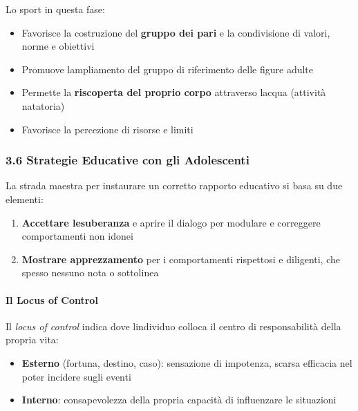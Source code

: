 \documentclass[a4paper,11pt]{article}
\providecommand{\tightlist}{%
  \setlength{\itemsep}{0pt}\setlength{\parskip}{0pt}}
\begin{document}
Lo sport in questa fase:

\begin{itemize}
      \tightlist
      \item
            Favorisce la costruzione del \textbf{gruppo dei pari} e la
            condivisione di valori, norme e obiettivi
      \item
            Promuove l\textquotesingle ampliamento del gruppo di riferimento delle
            figure adulte
      \item
            Permette la \textbf{riscoperta del proprio corpo} attraverso
            l\textquotesingle acqua (attività natatoria)
      \item
            Favorisce la percezione di risorse e limiti
\end{itemize}

\subsubsection{3.6 Strategie Educative con gli
      Adolescenti}\label{strategie-educative-con-gli-adolescenti}

La strada maestra per instaurare un corretto rapporto educativo si basa
su due elementi:

\begin{enumerate}
      \tightlist
      \item
            \textbf{Accettare l\textquotesingle esuberanza} e aprire il dialogo
            per modulare e correggere comportamenti non idonei
      \item
            \textbf{Mostrare apprezzamento} per i comportamenti rispettosi e
            diligenti, che spesso nessuno nota o sottolinea
\end{enumerate}

\paragraph{Il Locus of Control}\label{il-locus-of-control}

Il \emph{locus of control} indica dove l\textquotesingle individuo
colloca il centro di responsabilità della propria vita:

\begin{itemize}
      \tightlist
      \item
            \textbf{Esterno} (fortuna, destino, caso): sensazione di impotenza,
            scarsa efficacia nel poter incidere sugli eventi
      \item
            \textbf{Interno}: consapevolezza della propria capacità di influenzare
            le situazioni
\end{itemize}
\end{document}
